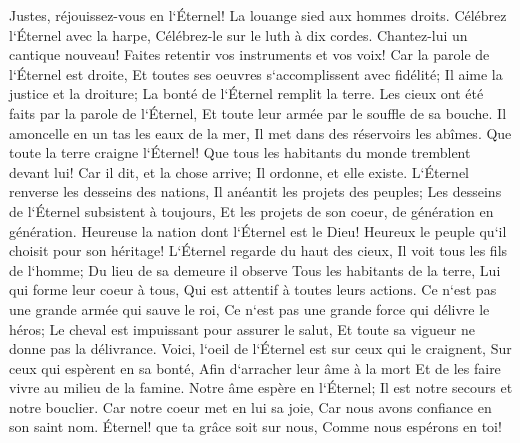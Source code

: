 \verse Justes, réjouissez-vous en l`Éternel! La louange sied aux hommes droits. 
\verse Célébrez l`Éternel avec la harpe, Célébrez-le sur le luth à dix cordes. 
\verse Chantez-lui un cantique nouveau! Faites retentir vos instruments et vos voix! 
\verse Car la parole de l`Éternel est droite, Et toutes ses oeuvres s`accomplissent avec fidélité; 
\verse Il aime la justice et la droiture; La bonté de l`Éternel remplit la terre. 
\verse Les cieux ont été faits par la parole de l`Éternel, Et toute leur armée par le souffle de sa bouche. 
\verse Il amoncelle en un tas les eaux de la mer, Il met dans des réservoirs les abîmes. 
\verse Que toute la terre craigne l`Éternel! Que tous les habitants du monde tremblent devant lui! 
\verse Car il dit, et la chose arrive; Il ordonne, et elle existe. 
\verse L`Éternel renverse les desseins des nations, Il anéantit les projets des peuples; 
\verse Les desseins de l`Éternel subsistent à toujours, Et les projets de son coeur, de génération en génération. 
\verse Heureuse la nation dont l`Éternel est le Dieu! Heureux le peuple qu`il choisit pour son héritage! 
\verse L`Éternel regarde du haut des cieux, Il voit tous les fils de l`homme; 
\verse Du lieu de sa demeure il observe Tous les habitants de la terre, 
\verse Lui qui forme leur coeur à tous, Qui est attentif à toutes leurs actions. 
\verse Ce n`est pas une grande armée qui sauve le roi, Ce n`est pas une grande force qui délivre le héros; 
\verse Le cheval est impuissant pour assurer le salut, Et toute sa vigueur ne donne pas la délivrance. 
\verse Voici, l`oeil de l`Éternel est sur ceux qui le craignent, Sur ceux qui espèrent en sa bonté, 
\verse Afin d`arracher leur âme à la mort Et de les faire vivre au milieu de la famine. 
\verse Notre âme espère en l`Éternel; Il est notre secours et notre bouclier. 
\verse Car notre coeur met en lui sa joie, Car nous avons confiance en son saint nom. 
\verse Éternel! que ta grâce soit sur nous, Comme nous espérons en toi! 

\chapter{}


